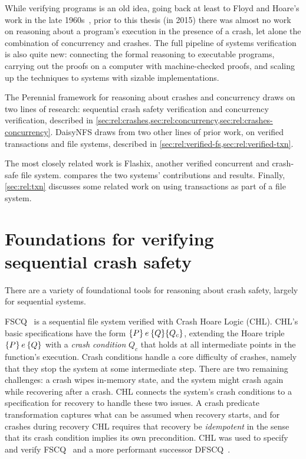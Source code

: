While verifying programs is an old idea, going back at least to Floyd and
Hoare's work in the late 1960s~\cite{floyd:meanings,hoare:logic}, prior to this
thesis (in 2015) there was almost no work on reasoning about a program's
execution in the presence of a crash, let alone the combination of concurrency
and crashes. The full pipeline of systems verification is also quite new:
connecting the formal reasoning to executable programs, carrying out the proofs
on a computer with machine-checked proofs, and scaling up the techniques to
systems with sizable implementations.

The Perennial framework for reasoning about crashes and concurrency draws on two
lines of research: sequential crash safety verification and concurrency
verification, described in
\cref{sec:rel:crashes,sec:rel:concurrency,sec:rel:crashes-concurrency}. DaisyNFS
draws from two other lines of prior work, on verified transactions and file
systems, described in \cref{sec:rel:verified-fs,sec:rel:verified-txn}.

The most closely related work is Flashix, another verified concurrent and
crash-safe file system.  compares the two systems'
contributions and results. Finally, \cref{sec:rel:txn} discusses some related work
on using transactions as part of a file system.


\section{Foundations for verifying sequential crash safety}
\label{sec:rel:crashes}

There are a variety of foundational tools for reasoning about crash safety,
largely for sequential systems.

FSCQ~\cite{chen:fscq,chen:dfscq,hchen-phd} is a sequential file
system verified with Crash Hoare Logic (CHL). CHL's basic specifications have
the form $\hoareC{P}{e}{Q}{Q_{c}}$, extending the Hoare triple $\hoare{P}{e}{Q}$
with a \emph{crash condition} $Q_{c}$ that holds at all intermediate points in the
function's execution. Crash conditions handle a core difficulty of crashes,
namely that they stop the system at some intermediate step. There are two
remaining challenges: a crash wipes in-memory state, and the system might crash again
while recovering after a crash. CHL connects the system's crash conditions to a
specification for recovery to handle these two issues. A crash predicate
transformation captures what can be assumed when recovery starts, and for
crashes during recovery CHL requires that recovery be \emph{idempotent} in the
sense that its crash condition implies its own precondition. CHL was used to
specify and verify FSCQ~\cite{chen:fscq} and a more performant successor
DFSCQ~\cite{chen:dfscq}.

